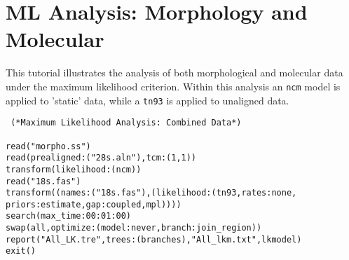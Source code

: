 
\section{ML Analysis: Morphology and Molecular}{\label{tutorial 18}}

This tutorial illustrates the analysis of both morphological and molecular 
data under the maximum likelihood criterion. Within this analysis an 
\texttt{ncm} model is applied to 'static' data, while a \texttt{tn93} is 
applied to unaligned data. 

\begin{verbatim}
 (*Maximum Likelihood Analysis: Combined Data*) 

read("morpho.ss")
read(prealigned:("28s.aln"),tcm:(1,1))
transform(likelihood:(ncm))
read("18s.fas")
transform((names:("18s.fas"),(likelihood:(tn93,rates:none,
priors:estimate,gap:coupled,mpl))))
search(max_time:00:01:00)
swap(all,optimize:(model:never,branch:join_region))
report("All_LK.tre",trees:(branches),"All_lkm.txt",lkmodel)
exit()
\end{verbatim}

